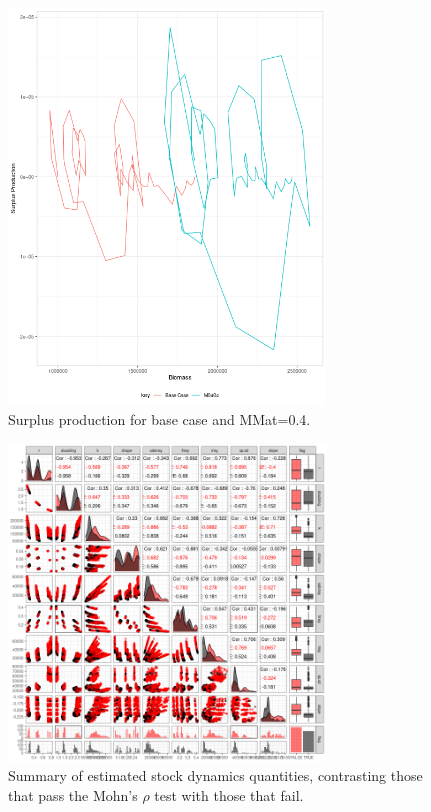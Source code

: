 \begin{figure}[ht!]\centering\includegraphics[width=0.75\textwidth]{figures/sp-b-2-1.png} \caption{Surplus production for base case and MMat=0.4.}
\label{fig:sp2}       
\end{figure}

\begin{figure}[ht!]\centering\includegraphics[width=0.75\textwidth]{figures/param-pairs-mohn3-1.png} \caption{Summary of estimated stock dynamics quantities, contrasting those that pass the Mohn's $\rho$ test with those that fail.}
\label{fig:param-pairs-1}       
\end{figure}

